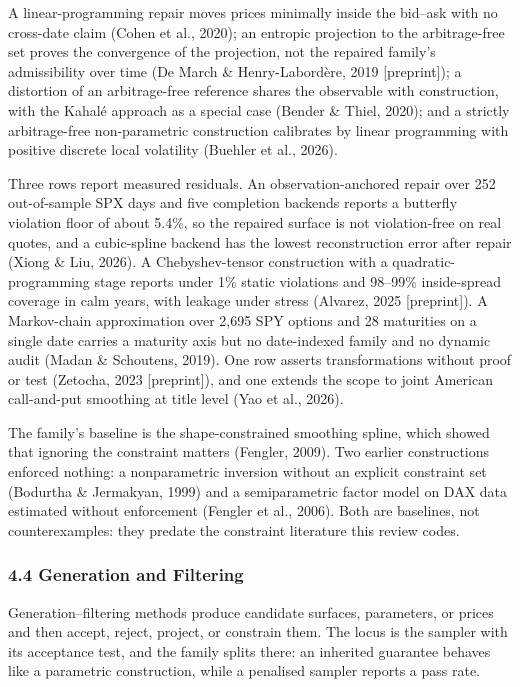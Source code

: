 \documentclass[11pt]{article}
\begin{document}
A linear-programming repair moves prices minimally inside the bid–ask with no cross-date claim (Cohen et al., 2020); an entropic projection to the arbitrage-free set proves the convergence of the projection, not the repaired family's admissibility over time (De March \& Henry-Labordère, 2019 [preprint]); a distortion of an arbitrage-free reference shares the observable with construction, with the Kahalé approach as a special case (Bender \& Thiel, 2020); and a strictly arbitrage-free non-parametric construction calibrates by linear programming with positive discrete local volatility (Buehler et al., 2026).

Three rows report measured residuals. An observation-anchored repair over 252 out-of-sample SPX days and five completion backends reports a butterfly violation floor of about 5.4\%, so the repaired surface is not violation-free on real quotes, and a cubic-spline backend has the lowest reconstruction error after repair (Xiong \& Liu, 2026). A Chebyshev-tensor construction with a quadratic-programming stage reports under 1\% static violations and 98–99\% inside-spread coverage in calm years, with leakage under stress (Alvarez, 2025 [preprint]). A Markov-chain approximation over 2,695 SPY options and 28 maturities on a single date carries a maturity axis but no date-indexed family and no dynamic audit (Madan \& Schoutens, 2019). One row asserts transformations without proof or test (Zetocha, 2023 [preprint]), and one extends the scope to joint American call-and-put smoothing at title level (Yao et al., 2026).

The family's baseline is the shape-constrained smoothing spline, which showed that ignoring the constraint matters (Fengler, 2009). Two earlier constructions enforced nothing: a nonparametric inversion without an explicit constraint set (Bodurtha \& Jermakyan, 1999) and a semiparametric factor model on DAX data estimated without enforcement (Fengler et al., 2006). Both are baselines, not counterexamples: they predate the constraint literature this review codes.

\subsubsection*{4.4 Generation and Filtering}
Generation–filtering methods produce candidate surfaces, parameters, or prices and then accept, reject, project, or constrain them. The locus is the sampler with its acceptance test, and the family splits there: an inherited guarantee behaves like a parametric construction, while a penalised sampler reports a pass rate.
\end{document}
